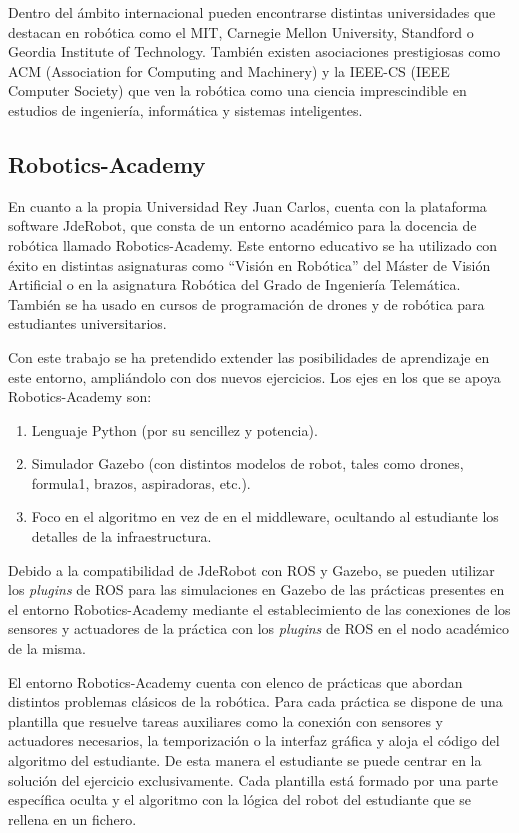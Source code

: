 Dentro del ámbito internacional pueden encontrarse distintas universidades que destacan en robótica como el MIT, Carnegie Mellon University, Standford o Geordia Institute of Technology. También existen asociaciones prestigiosas como ACM (Association for Computing and Machinery) y la IEEE-CS (IEEE Computer Society) que ven la robótica como una ciencia imprescindible en estudios de ingeniería, informática y sistemas inteligentes.

\subsection{Robotics-Academy}
En cuanto a la propia Universidad Rey Juan Carlos, cuenta con la plataforma software JdeRobot, que consta de un entorno académico para la docencia de robótica llamado Robotics-Academy. Este entorno educativo se ha utilizado con éxito en distintas asignaturas como ``Visión en Robótica'' del Máster de Visión Artificial o en la asignatura Robótica del Grado de Ingeniería Telemática. También se ha usado en cursos de programación de drones y de robótica para estudiantes universitarios.

Con este trabajo se ha pretendido extender las posibilidades de aprendizaje en este entorno, ampliándolo con dos nuevos ejercicios.
Los ejes en los que se apoya Robotics-Academy son:
\begin{enumerate}[label=\alph*)]
	\item Lenguaje Python (por su sencillez y potencia).
	\item Simulador Gazebo (con distintos modelos de robot, tales como drones, formula1, brazos, aspiradoras, etc.).
	\item Foco en el algoritmo en vez de en el middleware, ocultando al estudiante los detalles de la infraestructura.
\end{enumerate}

Debido a la compatibilidad de JdeRobot con ROS y Gazebo, se pueden utilizar los \textit{plugins} de ROS para las simulaciones en Gazebo de las prácticas presentes en el entorno Robotics-Academy mediante el establecimiento de las conexiones de los sensores y actuadores de la práctica con los \textit{plugins} de ROS en el nodo académico de la misma.

El entorno Robotics-Academy cuenta con elenco de prácticas que abordan distintos problemas clásicos de la robótica. Para cada práctica se dispone de una plantilla que resuelve tareas auxiliares como la conexión con sensores y actuadores necesarios, la temporización o la interfaz gráfica y aloja el código del algoritmo del estudiante. De esta manera el estudiante se puede centrar en la solución del ejercicio exclusivamente. Cada plantilla está formado por una parte específica oculta y el algoritmo con la lógica del robot del estudiante que se rellena en un fichero.

